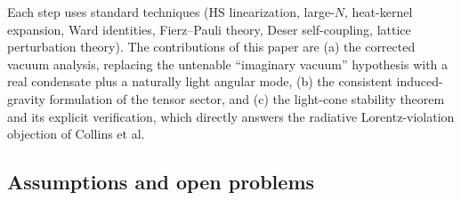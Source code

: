 \documentclass[11pt,a4paper]{article}
\begin{document}
Each step uses standard techniques (HS linearization, large-$N$,
heat-kernel expansion, Ward identities, Fierz--Pauli theory, Deser
self-coupling, lattice perturbation theory).
The contributions of this paper are
(a) the corrected vacuum analysis, replacing the untenable
``imaginary vacuum'' hypothesis with a real condensate plus a
naturally light angular mode,
(b) the consistent induced-gravity formulation of the tensor
sector, and
(c) the light-cone stability theorem and its explicit verification,
which directly answers the radiative Lorentz-violation objection of
Collins et al.

\subsection{Assumptions and open problems}
\end{document}
